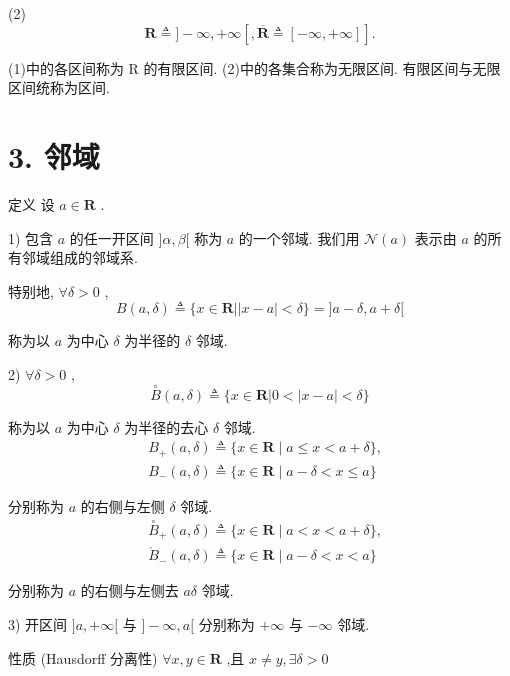 (2)
$$\mathbf{R} \triangleq  \rbrack  - \infty , + \infty \left\lbrack  {,\overline{\mathbf{R}} \triangleq  \left\lbrack  {-\infty , + \infty }\right\rbrack  }\right\rbrack  .$$

(1)中的各区间称为 $\mathrm{R}$ 的有限区间. (2)中的各集合称为无限区间. 有限区间与无限区间统称为区间.

\section*{3. 邻域}

定义 设 $a \in  \mathbf{R}$ .

1) 包含 $a$ 的任一开区间 $\rbrack \alpha ,\beta \lbrack$ 称为 $a$ 的一个邻域. 我们用 $\mathcal{N}\left( a\right)$ 表示由 $a$ 的所有邻域组成的邻域系.

特别地, $\forall \delta  > 0$ ,
$$B\left( {a,\delta }\right)  \triangleq  \{ x \in  \mathbf{R}\left| \right| x - a \mid   < \delta \}  = \rbrack a - \delta ,a + \delta \lbrack$$

称为以 $a$ 为中心 $\delta$ 为半径的 $\delta$ 邻域.

2) $\forall \delta  > 0$ ,
$$\overset{ \circ  }{B}\left( {a,\delta }\right)  \triangleq  \{ x \in  \mathbf{R}\left| {0 < }\right| x - a \mid   < \delta \}$$

称为以 $a$ 为中心 $\delta$ 为半径的去心 $\delta$ 邻域.
\begin{align*}
	&{B}_{ + }\left( {a,\delta }\right)  \triangleq  \{ x \in  \mathbf{R} \mid  a \leq  x < a + \delta \} ,\\
	&{B}_{ - }\left( {a,\delta }\right)  \triangleq  \{ x \in  \mathbf{R} \mid  a - \delta  < x \leq  a\}
\end{align*}

分别称为 $a$ 的右侧与左侧 $\delta$ 邻域.
\begin{align*}
	&{\overset{ \circ  }{B}}_{ + }\left( {a,\delta }\right)  \triangleq  \{ x \in  \mathbf{R} \mid  a < x < a + \delta \} ,\\
	&{\mathring{B}}_{ - }\left( {a,\delta }\right)  \triangleq  \{ x \in  \mathbf{R} \mid  a - \delta  < x < a\}
\end{align*}

分别称为 $a$ 的右侧与左侧去 ${a\delta }$ 邻域.

3) 开区间 $\rbrack a, + \infty \lbrack$ 与 $\rbrack  - \infty ,a\lbrack$ 分别称为 $+ \infty$ 与 $- \infty$ 邻域.

性质 (Hausdorff 分离性) $\forall x,y \in  \mathbf{R}$ ,且 $x \neq  y,\exists \delta  > 0$

